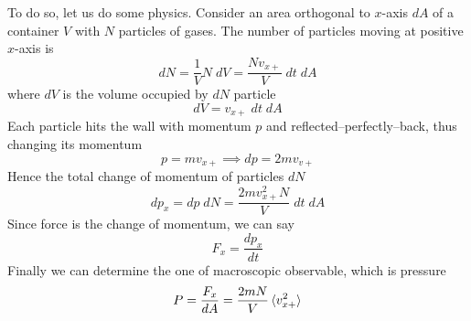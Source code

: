 \documentclass[../../../Main.tex]{subfiles}
\begin{document}
To do so, let us do some physics. Consider an area orthogonal to $x$-axis $dA$ of a container $V$ with $N$ particles of gases. The number of particles moving at positive $x$-axis is
\begin{equation*}
    dN=\frac{1}{V}N\;dV=\frac{Nv_{x+}}{V}\;dt\;dA
\end{equation*}
where $dV$ is the volume occupied by $dN$ particle
\begin{equation*}
    dV=v_{x+}\;dt\;dA
\end{equation*}
Each particle hits the wall with momentum $p$ and reflected--perfectly--back, thus changing its momentum 
\begin{equation*}
    p=mv_{x+}\implies dp=2mv_{v+}
\end{equation*} 
Hence the total change of momentum of particles $dN$
\begin{equation*}
    dp_{x}=dp\;dN=\frac{2mv_{x+}^2N}{V} \;dt\;dA
\end{equation*}
Since force is the change of momentum, we can say
\begin{equation*}
    F_{x}=\frac{dp_{x}}{dt}
\end{equation*}
Finally we can determine the one of macroscopic observable, which is pressure
\begin{equation*}
    P=\frac{F_x}{dA}=\frac{2mN}{V}\braket{v_{x+}^2}
\end{equation*}
\end{document}
